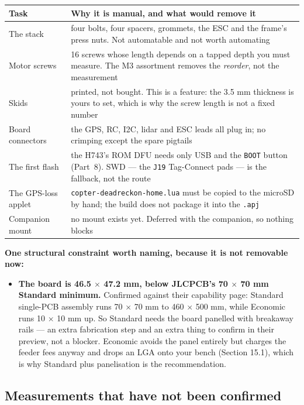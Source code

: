 \documentclass[11pt,a4paper]{article}
\newcommand{\file}[1]{\texttt{\small #1}}
\newcommand{\flag}[1]{\textcolor{warnred}{\textbf{#1}}}
\begin{document}
\begin{center}
\begin{tabular}{@{}P{0.25\textwidth}P{0.63\textwidth}@{}}
\toprule
\textbf{Task} & \textbf{Why it is manual, and what would remove it} \\
\midrule
The stack & four bolts, four spacers, grommets, the ESC and the frame's press nuts. Not
automatable and not worth automating \\
Motor screws & 16 screws whose length depends on a tapped depth you must measure. The M3
assortment removes the \emph{reorder}, not the measurement \\
Skids & printed, not bought. This is a feature: the 3.5 mm thickness is yours to set, which
is why the screw length is not a fixed number \\
Board connectors & the GPS, RC, I2C, lidar and ESC leads all plug in; no crimping except
the spare pigtails \\
The first flash & the H743's ROM DFU needs only USB and the \file{BOOT} button
(Part~8). SWD --- the \file{J19} Tag-Connect pads --- is the
fallback, not the route \\
The GPS-loss applet & \file{copter-deadreckon-home.lua} must be copied to the microSD by
hand; the build does not package it into the \file{.apj} \\
Companion mount & no mount exists yet. Deferred with the companion, so nothing blocks \\
\bottomrule
\end{tabular}
\end{center}

\textbf{One structural constraint worth naming, because it is not removable now:}

\begin{itemize}
\item \flag{The board is 46.5 $\times$ 47.2 mm, below JLCPCB's 70 $\times$ 70 mm Standard
minimum.} Confirmed against their capability page: Standard single-PCB assembly runs
70 $\times$ 70 mm to 460 $\times$ 500 mm, while Economic runs 10 $\times$ 10 mm up. So
Standard needs the board panelled with breakaway rails --- an extra fabrication step and an
extra thing to confirm in their preview, not a blocker. Economic avoids the panel entirely
but charges the feeder fees anyway and drops an LGA onto your bench (Section 15.1), which is
why Standard plus panelisation is the recommendation.
\end{itemize}

\subsection{Measurements that have not been confirmed}
\label{sec:audit-153}
\end{document}

